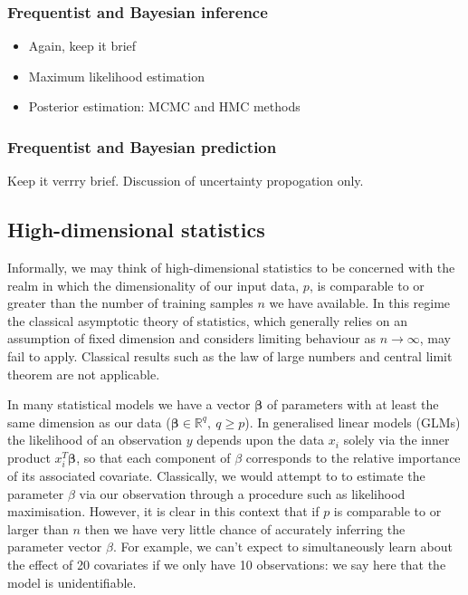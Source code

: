 \documentclass[thesis.tex]{subfiles}
\begin{document}
\subsubsection{Frequentist and Bayesian inference}
{\color{red} \begin{itemize}
    \item Again, keep it brief
    \item Maximum likelihood estimation
    \item Posterior estimation: MCMC and HMC methods
\end{itemize}}
\subsubsection{Frequentist and Bayesian prediction}
{\color{red} Keep it verrry brief. Discussion of uncertainty propogation only.}


\subsection{High-dimensional statistics}

Informally, we may think of high-dimensional statistics to be concerned with the realm in which the dimensionality of our input data, $p$, is comparable to or greater than the number of training samples $n$ we have available. In this regime the classical asymptotic theory of statistics, which generally relies on an assumption of fixed dimension and considers limiting behaviour as $n \rightarrow \infty$, may fail to apply. Classical results such as the law of large numbers and central limit theorem are not applicable. 

In many statistical models we have a vector $\mathbf{\beta}$ of parameters with at least the same dimension as our data ($\mathbf{\beta} \in \mathbb{R}^q, \ q \geq p$). In generalised linear models (GLMs) the likelihood of an observation $y$ depends upon the data $x_i$ solely via the inner product $x_i^T\mathbf{\beta}$, so that each component of $\beta$ corresponds to the relative importance of its associated covariate. Classically, we would attempt to to estimate the parameter $\beta$ via our observation through a procedure such as likelihood maximisation. However, it is clear in this context that if $p$ is comparable to or larger than $n$ then we have very little chance of accurately inferring the parameter vector $\beta$. For example, we can't expect to simultaneously learn about the effect of 20 covariates if we only have 10 observations: we say here that the model is unidentifiable. 
\end{document}
